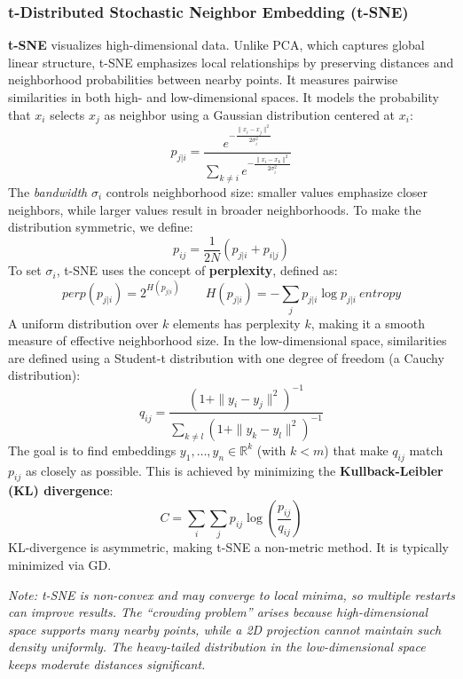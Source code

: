 \subsubsection{t-Distributed Stochastic Neighbor Embedding (t-SNE)}
\textbf{t-SNE} visualizes high-dimensional data. Unlike PCA, which captures global linear structure, t-SNE emphasizes local relationships by preserving distances and neighborhood probabilities between nearby points. It measures pairwise similarities in both high- and low-dimensional spaces. It models the probability that \( x_i \) selects \( x_j \) as neighbor using a Gaussian distribution centered at \( x_i \):
\begin{equation}
    p_{j|i} = \frac{e^{{-\frac{\|x_i - x_j\|^2}{2 \sigma_i^2}}}}{\sum_{k \neq i} e^{{-\frac{\|x_i - x_k\|^2}{2 \sigma_i^2}}}}
\end{equation}
The \textit{bandwidth} \( \sigma_i \) controls neighborhood size: smaller values emphasize closer neighbors, while larger values result in broader neighborhoods. To make the distribution symmetric, we define:
\begin{equation}
    p_{ij} = \frac{1}{2N}(p_{j|i} + p_{i|j})
\end{equation}
To set \( \sigma_i \), t-SNE uses the concept of \textbf{perplexity}, defined as:
\begin{equation}
    \textit{perp}(p_{j|i}) = 2^{H(p_{j|i})} \qquad H(p_{j|i}) =  -\sum_j p_{j|i} \log p_{j|i} ~entropy
\end{equation}
A uniform distribution over \( k \) elements has perplexity \( k \), making it a smooth measure of effective neighborhood size. In the low-dimensional space, similarities are defined using a Student-t distribution with one degree of freedom (a Cauchy distribution):
\begin{equation}
    q_{ij} = \frac{(1 + \|y_i - y_j\|^2)^{-1}}{\sum_{k \neq l} (1 + \|y_k - y_l\|^2)^{-1}}
\end{equation}
The goal is to find embeddings \( y_1, \dots, y_n \in \mathbb{R}^k \) (with \( k < m \)) that make \( q_{ij} \) match \( p_{ij} \) as closely as possible. This is achieved by minimizing the \textbf{Kullback-Leibler (KL) divergence}:
\begin{equation}
    C = \sum_i \sum_j p_{ij} \log \left( \frac{p_{ij}}{q_{ij}} \right)
\end{equation}
KL-divergence is asymmetric, making t-SNE a non-metric method. It is typically minimized via GD.

\textit{Note: t-SNE is non-convex and may converge to local minima, so multiple restarts can improve results. The ``crowding problem'' arises because high-dimensional space supports many nearby points, while a 2D projection cannot maintain such density uniformly. The heavy-tailed distribution in the low-dimensional space keeps moderate distances significant.}
